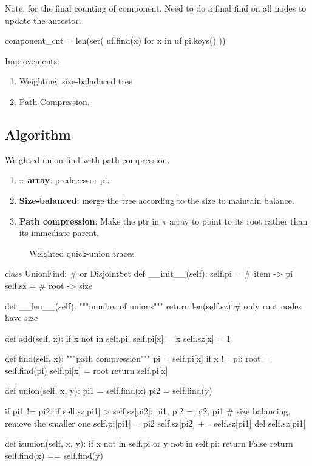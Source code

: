 Note, for the final counting of component. Need to do a final find on all nodes to
update the ancestor.
\begin{python}
component_cnt = len(set(
    uf.find(x)
    for x in uf.pi.keys()
))
\end{python}

Improvements:
\begin{enumerate}
\item Weighting: size-baladnced tree
\item Path Compression.
\end{enumerate}
\subsection{Algorithm}
Weighted union-find with path compression.\\
\begin{enumerate}
\item \textbf{$\pi$ array}: predecessor pi.
\item \textbf{Size-balanced}: merge the tree according to the size to maintain balance.
\item \textbf{Path compression}: Make the ptr in $\pi$ array to point to its root rather than its immediate parent.
\end{enumerate}
\begin{figure}[]
\centering
\subfloat{\texttt{[image: uf]}}
\caption{Weighted quick-union traces}
\label{fig:union_find}
\end{figure}

\begin{python}
class UnionFind:  # or DisjointSet
  def __init__(self):
    self.pi = {}  # item -> pi
    self.sz = {}  # root -> size

  def __len__(self):
    """number of unions"""
    return len(self.sz)  # only root nodes have size

  def add(self, x):
    if x not in self.pi:
      self.pi[x] = x
      self.sz[x] = 1

  def find(self, x):
    """path compression"""
    pi = self.pi[x]
    if x != pi:
      root = self.find(pi)
      self.pi[x] = root
    return self.pi[x]

  def union(self, x, y):
    pi1 = self.find(x)
    pi2 = self.find(y)

    if pi1 != pi2:
      if self.sz[pi1] > self.sz[pi2]:
        pi1, pi2 = pi2, pi1
        # size balancing, remove the smaller one
      self.pi[pi1] = pi2
      self.sz[pi2] += self.sz[pi1]
      del self.sz[pi1]

  def isunion(self, x, y):
    if x not in self.pi or y not in self.pi:
      return False
    return self.find(x) == self.find(y)
\end{python}

